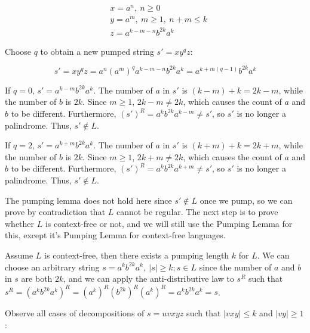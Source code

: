 \documentclass{article}
\begin{document}
\begin{align*}
&x = a^n, \: n \geq 0\\
&y = a^m, \: m \geq 1, \: n+m \leq k\\
&z = a^{k-m-n} b^{2k} a^k
\end{align*}

Choose $q$ to obtain a new pumped string $s'=xy^qz$: 

$$s' = xy^qz = a^n (a^m)^q a^{k-m-n} b^{2k} a^k = a^{k+m(q-1)} b^{2k} a^k$$

If $q = 0$, $s' = a^{k-m} b^{2k} a^k$. The number of $a$ in $s'$ is $(k-m) + k = 2k-m$, while the number of $b$ is $2k$. Since $m \geq 1$, $2k-m \neq 2k$, which causes the count of $a$ and $b$ to be different. Furthermore, $(s')^R = a^k b^{2k} a^{k-m} \neq s'$, so $s'$ is no longer a palindrome. Thus, $s' \not \in L$.

If $q = 2$, $s' = a^{k+m} b^{2k} a^k$. The number of $a$ in $s'$ is $(k+m) + k = 2k+m$, while the number of $b$ is $2k$. Since $m \geq 1$, $2k+m \neq 2k$, which causes the count of $a$ and $b$ to be different. Furthermore, $(s')^R = a^k b^{2k} a^{k+m} \neq s'$, so $s'$ is no longer a palindrome. Thus, $s' \not \in L$.

The pumping lemma does not hold here since $s' \not \in L$ once we pump, so we can prove by contradiction that $L$ cannot be regular. The next step is to prove whether $L$ is context-free or not, and we will still use the Pumping Lemma for this, except it's Pumping Lemma for context-free languages. 

Assume $L$ is context-free, then there exists a pumping length $k$ for $L$. We can choose an arbitrary string $s = a^k b^{2k} a^k, \: |s| \geq k; s \in L$ since the number of $a$ and $b$ in $s$ are both $2k$, and we can apply the anti-distributive law to $s^R$ such that $s^R = (a^k b^{2k} a^k)^R = (a^k)^R (b^{2k})^R (a^k)^R = a^k b^{2k} a^k = s$.

Observe all cases of decompositions of $s = uvxyz$ such that $|vxy| \leq k$ and $|vy| \geq 1$:
\end{document}
